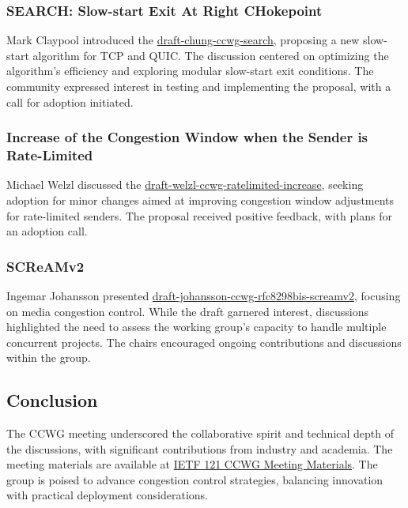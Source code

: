 \documentclass{article}
\begin{document}
\subsubsection{SEARCH: Slow-start Exit At Right CHokepoint}
Mark Claypool introduced the \href{https://datatracker.ietf.org/doc/html/draft-chung-ccwg-search}{draft-chung-ccwg-search}, proposing a new slow-start algorithm for TCP and QUIC. The discussion centered on optimizing the algorithm's efficiency and exploring modular slow-start exit conditions. The community expressed interest in testing and implementing the proposal, with a call for adoption initiated.

\subsubsection{Increase of the Congestion Window when the Sender is Rate-Limited}
Michael Welzl discussed the \href{https://datatracker.ietf.org/doc/html/draft-welzl-ccwg-ratelimited-increase}{draft-welzl-ccwg-ratelimited-increase}, seeking adoption for minor changes aimed at improving congestion window adjustments for rate-limited senders. The proposal received positive feedback, with plans for an adoption call.

\subsubsection{SCReAMv2}
Ingemar Johansson presented \href{https://datatracker.ietf.org/doc/html/draft-johansson-ccwg-rfc8298bis-screamv2}{draft-johansson-ccwg-rfc8298bis-screamv2}, focusing on media congestion control. While the draft garnered interest, discussions highlighted the need to assess the working group's capacity to handle multiple concurrent projects. The chairs encouraged ongoing contributions and discussions within the group.

\subsection{Conclusion}
The CCWG meeting underscored the collaborative spirit and technical depth of the discussions, with significant contributions from industry and academia. The meeting materials are available at \href{https://datatracker.ietf.org/meeting/121/materials/slides-121-ccwg}{IETF 121 CCWG Meeting Materials}. The group is poised to advance congestion control strategies, balancing innovation with practical deployment considerations.
\end{document}
